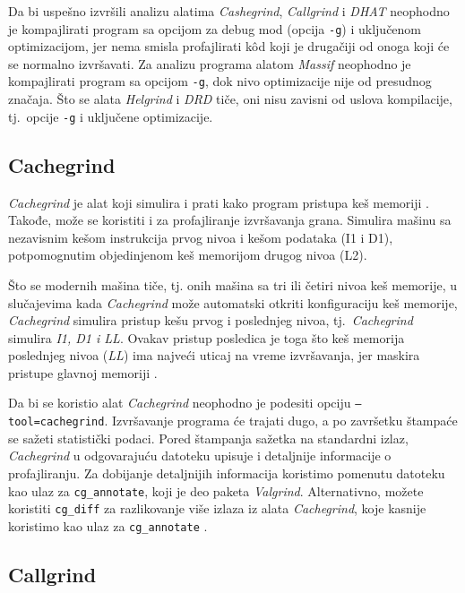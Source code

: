 \documentclass[12pt,oneside]{memoir}
\theoremstyle{plain}
\theoremstyle{definition}
\begin{document}
Da bi uspešno izvršili analizu alatima \textit{Cashegrind}, \textit{Callgrind} i \textit{DHAT} neophodno je kompajlirati program sa opcijom za debug mod (opcija \texttt{-g}) i uključenom optimizacijom, jer nema smisla profajlirati k\^od koji je drugačiji od onoga koji će se normalno izvršavati. Za analizu programa alatom \textit{Massif} neophodno je kompajlirati program sa opcijom \texttt{-g}, dok nivo optimizacije nije od presudnog značaja. Što se alata \textit{Helgrind} i \textit{DRD} tiče, oni nisu zavisni od uslova kompilacije, tj.~opcije \texttt{-g} i uključene optimizacije.

\subsection{Cachegrind}
\textit{Cachegrind} je alat koji simulira i prati kako program pristupa keš memoriji \cite{Cachegrind}. Takođe, može se koristiti i za profajliranje izvršavanja grana. Simulira mašinu sa nezavisnim kešom instrukcija prvog nivoa i kešom podataka (I1 i D1), potpomognutim objedinjenom keš memorijom drugog nivoa (L2). 

Što se modernih mašina tiče, tj. onih mašina sa tri ili četiri nivoa keš memorije, u slučajevima kada \textit{Cachegrind} može automatski otkriti konfiguraciju keš memorije, \textit{Cachegrind} simulira pristup kešu prvog i poslednjeg nivoa, tj.~\textit{Cachegrind} simulira \textit{I1, D1 i LL}. Ovakav pristup posledica je toga što keš memorija poslednjeg nivoa (\textit{LL}) ima najveći uticaj na vreme izvršavanja, jer maskira pristupe glavnoj memoriji \cite{Cachegrind}.%

Da bi se koristio alat \textit{Cachegrind} neophodno je podesiti opciju \texttt{–tool=cachegrind}. Izvršavanje programa će trajati dugo, a po završetku štampaće se sažeti statistički podaci. Pored štampanja sažetka na standardni izlaz, \textit{Cachegrind} u odgovarajuću datoteku upisuje i detaljnije informacije o profajliranju. Za dobijanje detaljnijih informacija koristimo pomenutu datoteku kao ulaz za \texttt{cg\_annotate}, koji je deo paketa \textit{Valgrind}. Alternativno, možete koristiti \texttt{cg\_diff} za razlikovanje više izlaza iz alata \textit{Cachegrind}, koje kasnije koristimo kao ulaz za \texttt{cg\_annotate} \cite{Cachegrind}.

\subsection{Callgrind}
\end{document}
